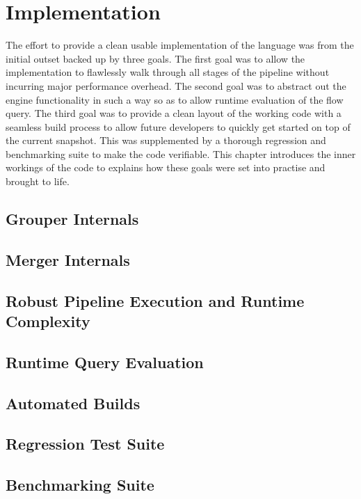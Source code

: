 \chapter{Implementation}\label{ch:implementation}

The effort to provide a clean usable implementation of the language was from
the initial outset backed up by three goals. The first goal was to allow the
implementation to flawlessly walk through all stages of the pipeline without
incurring major performance overhead. The second goal was to abstract out the
engine functionality in such a way so as to allow runtime evaluation of the
flow query. The third goal was to provide a clean layout of the working code
with a seamless build process to allow future developers to quickly get
started on top of the current snapshot. This was supplemented by a thorough
regression and benchmarking suite to make the code verifiable. This chapter
introduces the inner workings of the code to explains how these goals were set
into practise and brought to life.

\section{Grouper Internals}\label{sec:grouper-internals}

\section{Merger Internals}\label{sec:merger-internals}

\section{Robust Pipeline Execution and Runtime Complexity}\label{sec:pipeline}

\section{Runtime Query Evaluation}\label{sec:runtime-query}

\section{Automated Builds}\label{sec:automated-builds}

\section{Regression Test Suite}\label{sec:regression-suite}

\section{Benchmarking Suite}\label{sec:benchmarking-suite}

